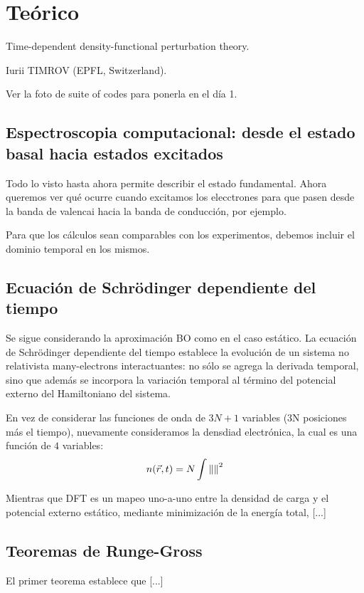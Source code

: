 \section{Teórico}

   Time-dependent density-functional perturbation theory.

   Iurii TIMROV (EPFL, Switzerland).

Ver la foto de suite of codes para ponerla en el día 1.

\subsection{Espectroscopia computacional: desde el estado basal hacia estados excitados}

  Todo lo visto hasta ahora permite describir el estado fundamental. Ahora queremos ver qué ocurre cuando excitamos los elecctrones para que pasen desde la banda de valencai hacia la banda de conducción, por ejemplo.

  Para que los cálculos sean comparables con los experimentos, debemos incluir el dominio temporal en los mismos.

\subsection{Ecuación de Schrödinger dependiente del tiempo}

  Se sigue considerando la aproximación BO como en el caso estático. La ecuación de Schrödinger dependiente del tiempo establece la evolución de un sistema no relativista many-electrons interactuantes: no sólo se agrega la derivada temporal, sino que además se incorpora la variación temporal al término del potencial externo del Hamiltoniano del sistema.

  En vez de considerar las funciones de onda de $3N+1$ variables (3N posiciones más el tiempo), nuevamente consideramos la densdiad electrónica, la cual es una función de $4$ variables:
    $$n (\vec{r}, t) = N \int \norm{}^2$$

  Mientras que DFT es un mapeo uno-a-uno entre la densidad de carga y el potencial externo estático, mediante minimización de la energía total, [...]

\subsection{Teoremas de Runge-Gross}

  El primer teorema establece que [...]

